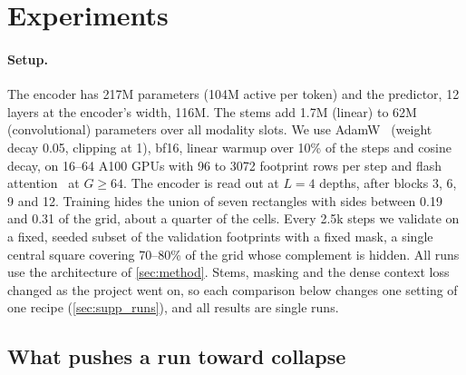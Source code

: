 \section{Experiments}
\label{sec:experiments}

\paragraph{Setup.} The encoder has 217M parameters (104M active per token) and the predictor, 12 layers at the encoder's width, 116M. The stems add 1.7M (linear) to 62M (convolutional) parameters over all modality slots. We use AdamW~\cite{loshchilov2019decoupled} (weight decay 0.05, clipping at 1), bf16, linear warmup over 10\% of the steps and cosine decay, on 16--64 A100 GPUs with 96 to 3072 footprint rows per step and flash attention~\cite{dao2022flashattention} at $G{\geq}64$. The encoder is read out at $L{=}4$ depths, after blocks 3, 6, 9 and 12. Training hides the union of seven rectangles with sides between 0.19 and 0.31 of the grid, about a quarter of the cells. Every 2.5k steps we validate on a fixed, seeded subset of the validation footprints with a fixed mask, a single central square covering 70--80\% of the grid whose complement is hidden. All runs use the architecture of \cref{sec:method}. Stems, masking and the dense context loss changed as the project went on, so each comparison below changes one setting of one recipe (\cref{sec:supp_runs}), and all results are single runs.

\subsection{What pushes a run toward collapse}
\label{sec:ablations}

